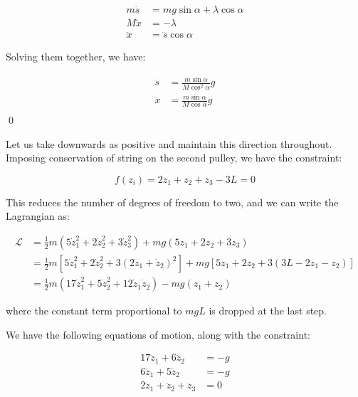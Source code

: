 \documentclass[12pt]{article}
\begin{document}
\begin{equation}
\begin{split}
    m \ddot{s} &= mg \sin{\alpha} + \lambda \cos{\alpha} \\
    M \ddot{x} &= -\lambda \\
    \ddot{x} &= \ddot{s} \cos{\alpha}
\end{split}
\end{equation}

Solving them together, we have:

\begin{equation}
\begin{split}
    \ddot{s} &= \frac{m \sin{\alpha}}{M \cos^{2}{\alpha}} g \\
    \ddot{x} &= \frac{m \sin{\alpha}}{M \cos{\alpha}} g \\
\end{split}
\end{equation}
\qed


Let us take downwards as positive and maintain this direction throughout. Imposing conservation of string on the second pulley, we have the constraint:

\begin{equation}
    f(z_{i}) = 2z_{1} + z_{2} + z_{3} - 3L = 0
\end{equation}

This reduces the number of degrees of freedom to two, and we can write the Lagrangian as:

\begin{equation}
\begin{split}
    \mathcal{L} &= \frac{1}{2} m (5 \dot{z}_{1}^{2} + 2 \dot{z}_{2}^{2} + 3 \dot{z}_{3}^{2}) + mg(5z_{1} + 2z_{2} + 3z_{3}) \\
                &= \frac{1}{2} m \left[ 5 \dot{z}_{1}^{2} + 2 \dot{z}_{2}^{2} + 3 (2\dot{z}_{1} + \dot{z}_{2})^{2} \right] + mg \left[ 5z_{1} + 2z_{2} + 3(3L - 2z_{1} - z_{2}) \right] \\
                &= \frac{1}{2} m \left( 17 \dot{z}_{1}^{2} + 5 \dot{z}_{2}^{2} + 12 \dot{z}_{1} \dot{z}_{2} \right) - mg \left( z_{1} + z_{2} \right)
\end{split}
\end{equation}

where the constant term proportional to $mgL$ is dropped at the last step.

We have the following equations of motion, along with the constraint:

\begin{equation}
\begin{split}
    17 \ddot{z}_{1} + 6 \ddot{z}_{2} &= -g \\
    6 \ddot{z}_{1} + 5 \ddot{z}_{2} &= -g \\
    2\ddot{z}_{1} + \ddot{z}_{2} + \ddot{z}_{3} &= 0
\end{split}
\end{equation}
\end{document}
